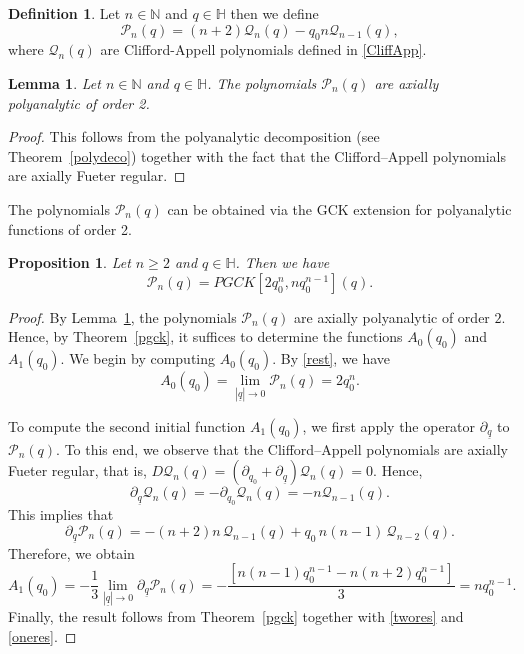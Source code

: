 \documentclass[reqno,11pt]{amsart}
\numberwithin{equation}{section}
\newtheorem{lemma}[theorem]{Lemma}
\newtheorem{proposition}[theorem]{Proposition}
\theoremstyle{definition}
\newtheorem{definition}[theorem]{Definition}
\begin{document}
\begin{definition}
\label{poly}
Let $n \in \mathbb{N}$ and $q \in \mathbb{H}$ then we define
\begin{equation}
\label{pol}
\mathcal{P}_n(q)= (n+2) \mathcal{Q}_n(q)-q_0n \mathcal{Q}_{n-1}(q),
\end{equation}
where $\mathcal{Q}_n(q)$ are Clifford-Appell polynomials defined in \eqref{CliffApp}.
\end{definition}


\begin{lemma}
\label{poly2}
Let $n \in \mathbb{N}$ and $q \in \mathbb{H}$. The polynomials $ \mathcal{P}_n(q)$ are axially polyanalytic of order 2.
\end{lemma}
\begin{proof}
This follows from the polyanalytic decomposition (see Theorem~\ref{polydeco}) together with the fact that the Clifford–Appell polynomials are axially Fueter regular.
\end{proof}

The polynomials $\mathcal{P}_n(q)$ can be obtained via the GCK extension for polyanalytic functions of order 2.

\begin{proposition}
\label{polyex}
Let $n \geq 2$ and $q \in \mathbb{H}$. Then we have
\begin{equation}
\mathcal{P}_n(q)=PGCK[2 q_0^n, n q_0^{n-1}](q).
\end{equation}
\end{proposition}
\begin{proof}
By Lemma~\ref{poly2}, the polynomials $\mathcal{P}_n(q)$ are axially polyanalytic of order $2$. Hence, by Theorem~\ref{pgck}, it suffices to determine the functions $A_0(q_0)$ and $A_1(q_0)$. We begin by computing $A_0(q_0)$. By \eqref{rest}, we have
\begin{equation}
	\label{twores}
	A_0(q_0)= \lim_{|\underline{q}| \to 0} \mathcal{P}_n(q)=2q_0^n.
\end{equation}

To compute the second initial function $A_1(q_0)$, we first apply the operator $\partial_{\underline{q}}$ to $\mathcal{P}_{n}(q)$. To this end, we observe that the Clifford--Appell polynomials are axially Fueter regular, that is, $ D\mathcal{Q}_n(q)= (\partial_{q_0}+\partial_{\underline{q}})\mathcal{Q}_n(q)=0$.
Hence,
$$
\partial_{\underline{q}} \mathcal{Q}_n(q)=-\partial_{q_0} \mathcal{Q}_n(q)=-n \mathcal{Q}_{n-1}(q).
$$
This implies that
$$
\partial_{\underline{q}} \mathcal{P}_{n}(q)=-(n+2)n\,\mathcal{Q}_{n-1}(q)+q_0\,n(n-1)\,\mathcal{Q}_{n-2}(q).
$$
Therefore, we obtain
\begin{equation}
	\label{oneres}
	A_1(q_0)=-\frac{1}{3} \lim_{|\underline{q}| \to 0} \partial_{\underline{q}} \mathcal{P}_n(q)
	= -\frac{[n(n-1) q_0^{n-1}-n(n+2)q_0^{n-1}]}{3}
	= n q_0^{n-1}.
\end{equation}
Finally, the result follows from Theorem~\ref{pgck} together with \eqref{twores} and \eqref{oneres}.
\end{proof}
\end{document}
